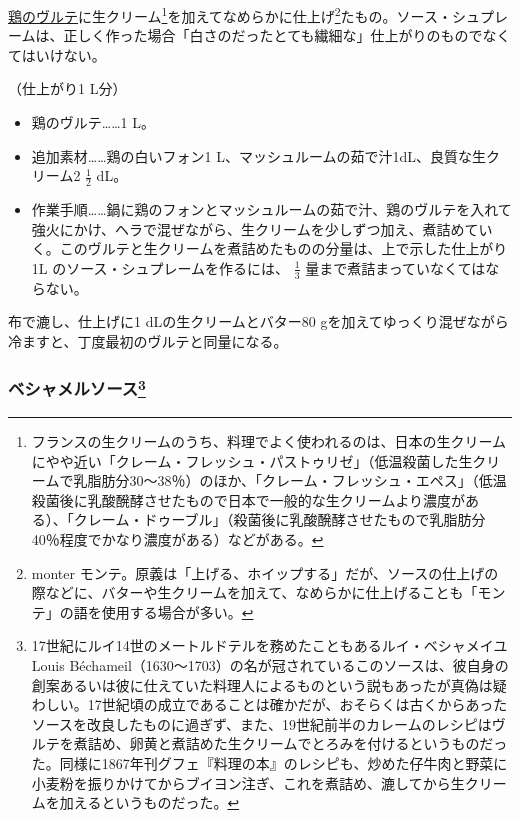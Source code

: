 \begin{recette}
\protect\hyperlink{veloute-de-volaille}{鶏のヴルテ}に生クリーム\footnote{フランスの生クリームのうち、料理でよく使われるのは、日本の生クリームにやや近い「クレーム・フレッシュ・パストゥリゼ」（低温殺菌した生クリームで乳脂肪分30〜38％）のほか、「クレーム・フレッシュ・エペス」（低温殺菌後に乳酸醗酵させたもので日本で一般的な生クリームより濃度がある）、「クレーム・ドゥーブル」（殺菌後に乳酸醗酵させたもので乳脂肪分40％程度でかなり濃度がある）などがある。}を加えてなめらかに仕上げ\footnote{monter
  モンテ。原義は「上げる、ホイップする」だが、ソースの仕上げの際などに、バターや生クリームを加えて、なめらかに仕上げることも「モンテ」の語を使用する場合が多い。}たもの。ソース・シュプレームは、正しく作った場合「白さのだったとても繊細な」仕上がりのものでなくてはいけない。

（仕上がり1 L分）

\begin{itemize}
\item
  鶏のヴルテ\ldots{}\ldots{}1 L。
\item
  追加素材\ldots{}\ldots{}鶏の白いフォン1
  L、マッシュルームの茹で汁1dL、良質な生クリーム2 \(\frac{1}{2}\) dL。
\item
  作業手順\ldots{}\ldots{}鍋に鶏のフォンとマッシュルームの茹で汁、鶏のヴルテを入れて強火にかけ、ヘラで混ぜながら、生クリームを少しずつ加え、煮詰めていく。このヴルテと生クリームを煮詰めたものの分量は、上で示した仕上がり1L
  のソース・シュプレームを作るには、 \(\frac{1}{3}\)
  量まで煮詰まっていなくてはならない。
\end{itemize}

布で漉し、仕上げに1 dLの生クリームとバター80
gを加えてゆっくり混ぜながら冷ますと、丁度最初のヴルテと同量になる。

\hypertarget{sauce-bechamel}{%
\subsubsection[ベシャメルソース]{\texorpdfstring{ベシャメルソース\footnote{17世紀にルイ14世のメートルドテルを務めたこともあるルイ・ベシャメイユLouis
  Béchameil（1630〜1703）の名が冠されているこのソースは、彼自身の創案あるいは彼に仕えていた料理人によるものという説もあったが真偽は疑わしい。17世紀頃の成立であることは確かだが、おそらくは古くからあったソースを改良したものに過ぎず、また、19世紀前半のカレームのレシピはヴルテを煮詰め、卵黄と煮詰めた生クリームでとろみを付けるというものだった。同様に1867年刊グフェ『料理の本』のレシピも、炒めた仔牛肉と野菜に小麦粉を振りかけてからブイヨン注ぎ、これを煮詰め、漉してから生クリームを加えるというものだった。}}{ベシャメルソース}}\label{sauce-bechamel}}


\end{recette}
